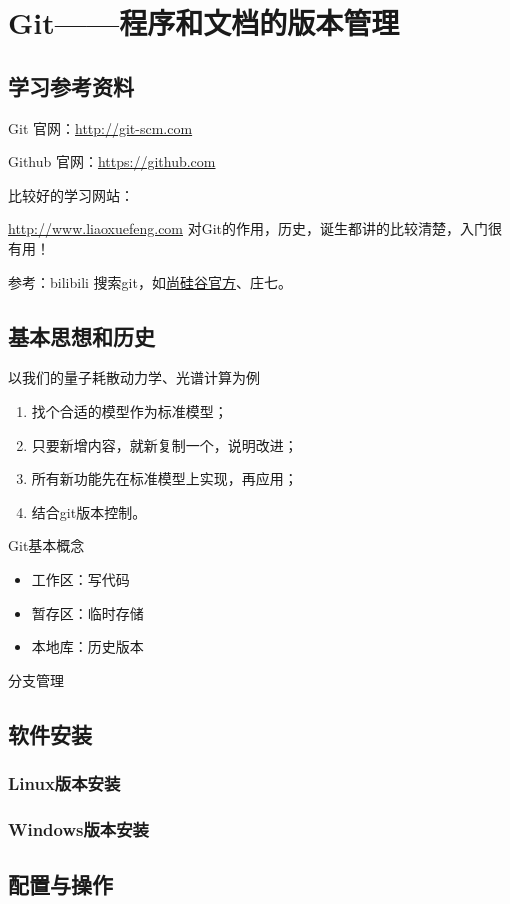 \chapter{Git——程序和文档的版本管理}
\section{学习参考资料}
Git 官网：\url{http://git-scm.com}

Github 官网：\url{https://github.com}

比较好的学习网站：

\url{http://www.liaoxuefeng.com} 对Git的作用，历史，诞生都讲的比较清楚，入门很有用！


参考：bilibili 搜索git，如\underline{尚硅谷官方}、庄七。


\section{基本思想和历史}
以我们的量子耗散动力学、光谱计算为例
\begin{enumerate}
\item 找个合适的模型作为标准模型；
\item 只要新增内容，就新复制一个，说明改进；
\item 所有新功能先在标准模型上实现，再应用；
\item 结合git版本控制。
\end{enumerate}


Git基本概念
\begin{itemize}
\item 工作区：写代码
\item 暂存区：临时存储
\item 本地库：历史版本
\end{itemize}

分支管理





\section{软件安装}
\subsection{Linux版本安装}
\subsection{Windows版本安装}


\section{配置与操作}
